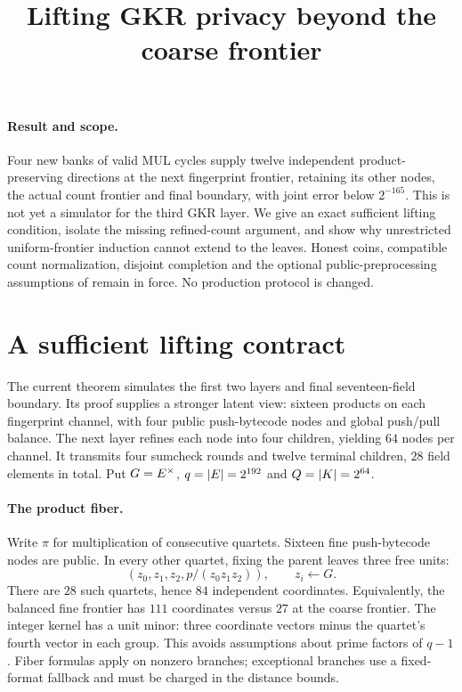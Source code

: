 \documentclass[11pt]{article}
\title{Lifting GKR privacy beyond the coarse frontier}
\author{}
\date{}
\begin{document}
\maketitle
\vspace{-2em}

\paragraph{Result and scope.} Four new banks of valid MUL cycles supply twelve independent product-preserving directions at the next fingerprint frontier, retaining its other nodes, the actual count frontier and final boundary, with joint error below $2^{-165}$. This is not yet a simulator for the third GKR layer. We give an exact sufficient lifting condition, isolate the missing refined-count argument, and show why unrestricted uniform-frontier induction cannot extend to the leaves. Honest coins, compatible count normalization, disjoint completion and the optional public-preprocessing assumptions of  remain in force. No production protocol is changed.

\section{A sufficient lifting contract}

The current theorem simulates the first two layers and final seventeen-field boundary. Its proof supplies a stronger latent view: sixteen products on each fingerprint channel, with four public push-bytecode nodes and global push/pull balance. The next layer refines each node into four children, yielding $64$ nodes per channel. It transmits four sumcheck rounds and twelve terminal children, $28$ field elements in total. Put $G=E^\times$, $q=|E|=2^{192}$ and $Q=|K|=2^{64}$.

\paragraph{The product fiber.} Write $\pi$ for multiplication of consecutive quartets. Sixteen fine push-bytecode nodes are public. In every other quartet, fixing the parent leaves three free units:
\[
 (z_0,z_1,z_2,p/(z_0z_1z_2)),\qquad z_i\gets G.
\]
There are $28$ such quartets, hence $84$ independent coordinates. Equivalently, the balanced fine frontier has $111$ coordinates versus $27$ at the coarse frontier. The integer kernel has a unit minor: three coordinate vectors minus the quartet's fourth vector in each group. This avoids assumptions about prime factors of $q-1$. Fiber formulas apply on nonzero branches; exceptional branches use a fixed-format fallback and must be charged in the distance bounds.
\end{document}
